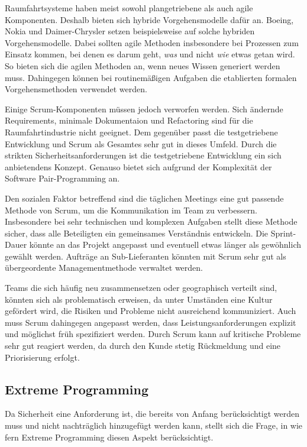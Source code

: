Raumfahrtsysteme haben meist sowohl plangetriebene als auch agile Komponenten.
Deshalb bieten sich hybride Vorgehensmodelle dafür an.
Boeing, Nokia und Daimer-Chrysler setzen beispielsweise auf solche hybriden  Vorgehensmodelle.
Dabei sollten agile Methoden insbesondere bei Prozessen zum Einsatz kommen, bei denen es darum geht, \emph{was} und nicht \emph{wie} etwas getan wird.
So bieten sich die agilen Methoden an, wenn neues Wissen generiert werden muss. 
Dahingegen können bei routinemäßigen Aufgaben die etablierten formalen Vorgehensmethoden verwendet werden.
\parencite[Vgl.][S. 43]{Carpenter:2014aa}

Einige Scrum-Komponenten müssen jedoch verworfen werden.
Sich ändernde Requirements, minimale Dokumentaion und Refactoring sind für die Raumfahrtindustrie nicht geeignet.
Dem gegenüber passt die testgetriebene Entwicklung und Scrum als Gesamtes sehr gut in dieses Umfeld.
Durch die strikten Sicherheitsanforderungen ist die testgetriebene Entwicklung ein sich anbietendens Konzept.
Genauso bietet sich aufgrund der Komplexität der Software Pair-Programming an.
\parencite[Vgl.][S. 43 f.]{Carpenter:2014aa}

Den sozialen Faktor betreffend sind die täglichen Meetings eine gut passende Methode von Scrum, um die Kommunikation im Team zu verbessern.
Insbesondere bei sehr technischen und komplexen Aufgaben stellt diese Methode sicher, dass alle Beteiligten ein gemeinsames Verständnis entwickeln.
Die Sprint-Dauer könnte an das Projekt angepasst und eventuell etwas länger als gewöhnlich gewählt werden.
Aufträge an Sub-Lieferanten könnten mit Scrum sehr gut als übergeordente Managementmethode verwaltet werden.
\parencite[Vgl.][S. 43 f.]{Carpenter:2014aa}

Teams die sich häufig neu zusammensetzen oder geographisch verteilt sind, könnten sich als problematisch erweisen, da unter Umständen eine Kultur gefördert wird, die Risiken und Probleme nicht ausreichend kommuniziert.
Auch muss Scrum dahingegen angepasst werden, dass Leistungsanforderungen explizit und möglichst früh spezifiziert werden.
Durch Scrum kann auf kritische Probleme sehr gut reagiert werden, da durch den Kunde stetig Rückmeldung und eine Priorisierung erfolgt.
\parencite[Vgl.][S. 44]{Carpenter:2014aa}

\subsection{Extreme Programming}

Da Sicherheit eine Anforderung ist, die bereits von Anfang berücksichtigt werden muss und nicht nachträglich hinzugefügt werden kann, stellt sich die Frage, in wie fern Extreme Programming diesen Aspekt berücksichtigt.

